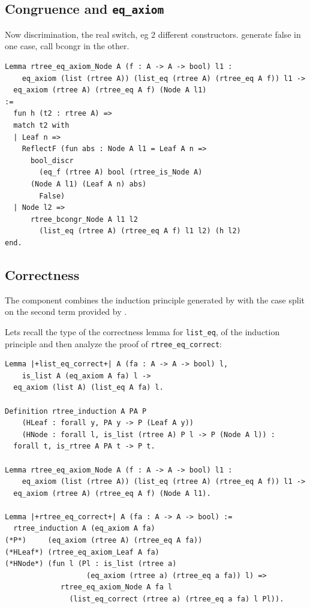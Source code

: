 \documentclass[sigplan,10pt,review]{acmart}\settopmatter{printfolios=true,printccs=false,printacmref=false}
\newcommand{\derive}[1]{\keys{#1}}
\begin{document}
\subsection{Congruence and \lstinline+eq_axiom+} %

Now discrimination, the real switch, eg 2 different constructors.
generate false in one case, call bcongr in the other.

\begin{lstlisting}
Lemma rtree_eq_axiom_Node A (f : A -> A -> bool) l1 :
    eq_axiom (list (rtree A)) (list_eq (rtree A) (rtree_eq A f)) l1 ->
  eq_axiom (rtree A) (rtree_eq A f) (Node A l1)
:=
  fun h (t2 : rtree A) =>
  match t2 with
  | Leaf n =>
    ReflectF (fun abs : Node A l1 = Leaf A n =>
      bool_discr
        (eq_f (rtree A) bool (rtree_is_Node A)
	  (Node A l1) (Leaf A n) abs)
        False)
  | Node l2 =>
      rtree_bcongr_Node A l1 l2
        (list_eq (rtree A) (rtree_eq A f) l1 l2) (h l2)
end.
\end{lstlisting}

\subsection{Correctness} %
\label{sec:derive:eqcorrect}

The \derive{eqcorrect} component combines the induction
principle generated by \derive{induction} with the
case split on the second term provided by \derive{eqK}.

Lets recall the type of the correctness lemma for
\lstinline+list_eq+, of the induction principle
and then analyze the proof of
\lstinline+rtree_eq_correct+:

\begin{lstlisting}
Lemma |+list_eq_correct+| A (fa : A -> A -> bool) l,
    is_list A (eq_axiom A fa) l ->
  eq_axiom (list A) (list_eq A fa) l.

Definition rtree_induction A PA P  
    (HLeaf : forall y, PA y -> P (Leaf A y))
    (HNode : forall l, is_list (rtree A) P l -> P (Node A l)) :
  forall t, is_rtree A PA t -> P t.

Lemma rtree_eq_axiom_Node A (f : A -> A -> bool) l1 :
    eq_axiom (list (rtree A)) (list_eq (rtree A) (rtree_eq A f)) l1 ->
  eq_axiom (rtree A) (rtree_eq A f) (Node A l1).
       
Lemma |+rtree_eq_correct+| A (fa : A -> A -> bool) :=
  rtree_induction A (eq_axiom A fa)
(*P*)     (eq_axiom (rtree A) (rtree_eq A fa))
(*HLeaf*) (rtree_eq_axiom_Leaf A fa)
(*HNode*) (fun l (Pl : is_list (rtree a)
                   (eq_axiom (rtree a) (rtree_eq a fa)) l) =>
             rtree_eq_axiom_Node A fa l
               (list_eq_correct (rtree a) (rtree_eq a fa) l Pl)).
\end{lstlisting}
\end{document}
